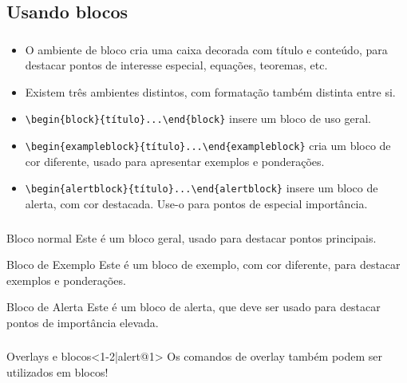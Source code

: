 \documentclass[12pt, xcolor=table, aspectratio=169]{beamer}
\makeatletter
\newcommand*{\currentname}{\@currentlabelname}
\makeatother
\begin{document}
\subsection[Usando blocos]{Usando blocos}

\begin{frame}
 \frametitle{\currentname}
 \begin{itemize}
  \item O ambiente de bloco cria uma caixa decorada com título e conteúdo, para destacar pontos de interesse especial, equações, teoremas, etc.
  \item Existem três ambientes distintos, com formatação também distinta entre si.
  \item \texttt{{\textbackslash}begin\{block\}\{título\}...{\textbackslash}end\{block\}} insere um bloco de uso geral.
  \item \texttt{{\textbackslash}begin\{exampleblock\}\{título\}...{\textbackslash}end\{exampleblock\}} cria um bloco de cor diferente, usado para apresentar exemplos e ponderações.
  \item \texttt{{\textbackslash}begin\{alertblock\}\{título\}...{\textbackslash}end\{alertblock\}} insere um bloco de alerta, com cor destacada. Use-o para pontos de especial importância.
  \end{itemize}
\end{frame}

\begin{frame}
  \frametitle{\currentname}
  \begin{block}{Bloco normal}
   Este é um bloco geral, usado para destacar pontos principais.
  \end{block}
  \begin{exampleblock}{Bloco de Exemplo}
    Este é um bloco de exemplo, com cor diferente, para destacar exemplos e ponderações.
  \end{exampleblock}
  \begin{alertblock}{Bloco de Alerta}
    Este é um bloco de alerta, que deve ser usado para destacar pontos de importância elevada.
  \end{alertblock}
\end{frame}

\begin{frame}
  \frametitle{\currentname}
  \begin{block}{Overlays e blocos}<1-2|alert@1>
   Os comandos de overlay também podem ser utilizados em blocos! 
  \end{block}

\end{frame}
\end{document}
